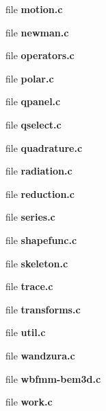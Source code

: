 \begin{DoxyCompactItemize}
\item 
file {\bfseries motion.\+c}
\item 
file {\bfseries newman.\+c}
\item 
file {\bfseries operators.\+c}
\item 
file {\bfseries polar.\+c}
\item 
file {\bfseries qpanel.\+c}
\item 
file {\bfseries qselect.\+c}
\item 
file {\bfseries quadrature.\+c}
\item 
file {\bfseries radiation.\+c}
\item 
file {\bfseries reduction.\+c}
\item 
file {\bfseries series.\+c}
\item 
file {\bfseries shapefunc.\+c}
\item 
file {\bfseries skeleton.\+c}
\item 
file {\bfseries trace.\+c}
\item 
file {\bfseries transforms.\+c}
\item 
file {\bfseries util.\+c}
\item 
file {\bfseries wandzura.\+c}
\item 
file {\bfseries wbfmm-\/bem3d.\+c}
\item 
file {\bfseries work.\+c}
\end{DoxyCompactItemize}
